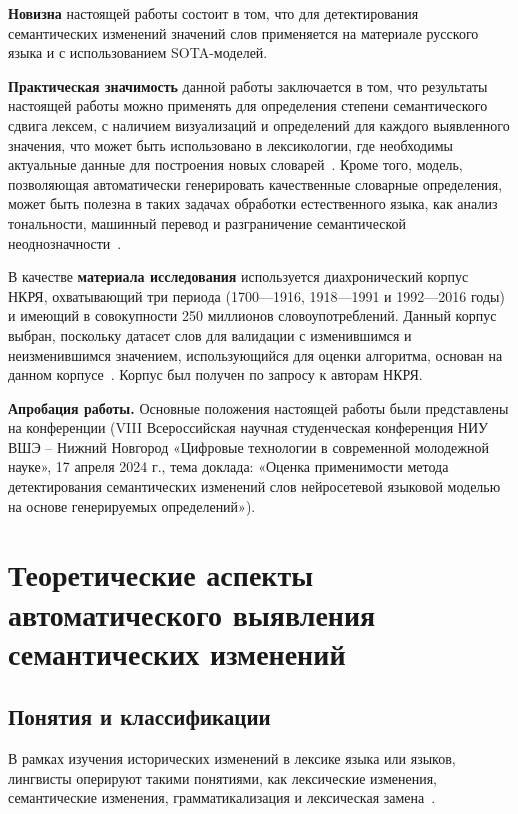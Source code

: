 \documentclass[LI,VKR]{HSEUniversity}
\begin{document}
\textbf{Новизна} настоящей работы состоит в том, что для детектирования семантических изменений
значений слов применяется на материале русского языка и с использованием SOTA-моделей.

\textbf{Практическая значимость} данной работы заключается в том, что результаты настоящей работы
можно применять для определения степени семантического сдвига лексем, с наличием визуализаций и
определений для каждого выявленного значения, что может быть использовано в лексикологии,
где необходимы актуальные данные для построения новых словарей~\cite{DefinitionGenerationMainArticle}.
Кроме того, модель, позволяющая автоматически генерировать качественные словарные определения,
может быть полезна в таких задачах обработки естественного языка, как анализ тональности,
машинный перевод и разграничение семантической неоднозначности~\cite{DefinitionModelingReviewAndDatasetAnalysis}.

В качестве \textbf{материала исследования} используется диахронический корпус НКРЯ, охватывающий
три периода (1700—1916, 1918—1991 и 1992—2016 годы) и имеющий в совокупности 250 миллионов
словоупотреблений.
Данный корпус выбран, поскольку датасет слов для валидации с изменившимся и неизменившимся значением,
использующийся для оценки алгоритма, основан на данном корпусе~\cite{rushifteval}.
Корпус был получен по запросу к авторам НКРЯ.

\textbf{Апробация работы.}
Основные положения настоящей работы были представлены на конференции
(VIII Всероссийская научная студенческая конференция НИУ ВШЭ – Нижний Новгород
«Цифровые технологии в современной молодежной науке», 17 апреля 2024 г.,
тема доклада: «Оценка применимости метода детектирования семантических изменений слов нейросетевой
языковой моделью на основе генерируемых определений»).

\chapter{Теоретические аспекты автоматического выявления семантических изменений}

\section{Понятия и классификации}

В рамках изучения исторических изменений в лексике языка или языков, лингвисты оперируют
такими понятиями, как лексические изменения, семантические изменения,
грамматикализация и лексическая замена~\cite{TahmasebiComputationalApproachesToSemanticChange}.
\end{document}
